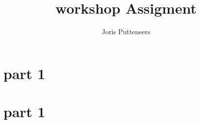 

\title{\textbf{\huge workshop Assigment}}
\author{Joris Putteneers}
\date{}

\pagestyle{mypagestyle}



\maketitle

\chapter{part 1}


\chapter{part 1}

%
%
%
%
%
%
%
%



